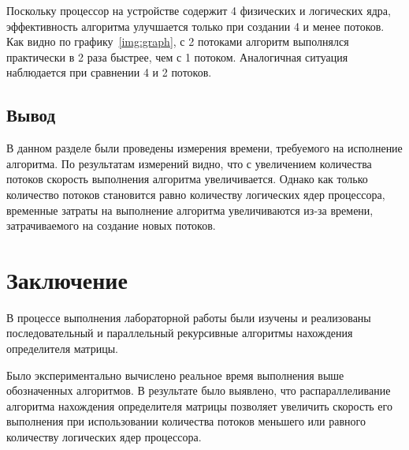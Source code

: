 \documentclass[12pt]{report}
\begin{document}
    Поскольку процессор на устройстве содержит 4 физических и логических ядра,
    эффективность алгоритма улучшается только при создании 4 и менее потоков.
    Как видно по графику~\ref{img:graph}, с 2 потоками алгоритм выполнялся практически
    в 2 раза быстрее, чем с 1 потоком.
    Аналогичная ситуация наблюдается при сравнении 4 и 2 потоков.


    \section{Вывод}
    В данном разделе были проведены измерения времени, требуемого на исполнение алгоритма.
    По результатам измерений видно, что с увеличением количества потоков скорость выполнения
    алгоритма увеличивается.
    Однако как только количество потоков становится равно количеству логических ядер процессора,
    временные затраты на выполнение алгоритма увеличиваются из-за времени, затрачиваемого на
    создание новых потоков.


    \newpage

    \chapter*{Заключение}
    В процессе выполнения лабораторной работы были изучены и реализованы последовательный и
    параллельный рекурсивные алгоритмы нахождения определителя матрицы.

    Было экспериментально вычислено реальное время выполнения выше обозначенных алгоритмов.
    В результате было выявлено, что распараллеливание алгоритма нахождения определителя
    матрицы позволяет увеличить скорость его выполнения при использовании количества потоков
    меньшего или равного количеству логических ядер процессора.


    \newpage

\end{document}
